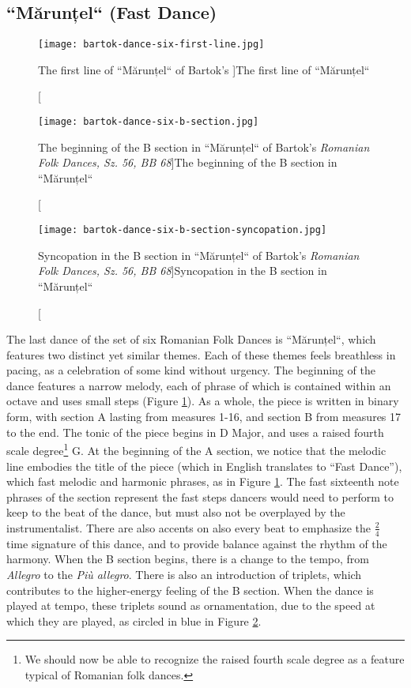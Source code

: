 \subsection{``Mărunțel`` (Fast Dance)}

\begin{figure}
  \centering
  \texttt{[image: bartok-dance-six-first-line.jpg]}
  \caption[The first line of ``Mărunțel`` of Bartok's ]{The first line of ``Mărunțel``}
  \label{fig:bartok-dance-six-first-line}
\end{figure}

\begin{figure}
  \centering
  \texttt{[image: bartok-dance-six-b-section.jpg]}
  \caption[The beginning of the B section in ``Mărunțel`` of Bartok's \textit{Romanian Folk Dances, Sz. 56, BB 68}]{The beginning of the B section in ``Mărunțel``}
  \label{fig:bartok-dance-six-b-section}
\end{figure}

\begin{figure}
  \centering
  \texttt{[image: bartok-dance-six-b-section-syncopation.jpg]}
  \caption[Syncopation in the B section in ``Mărunțel`` of Bartok's \textit{Romanian Folk Dances, Sz. 56, BB 68}]{Syncopation in the B section in ``Mărunțel``}
  \label{fig:bartok-dance-six-b-section-syncopation}
\end{figure}


The last dance of the set of six Romanian Folk Dances is ``Mărunțel``, which features two distinct yet similar themes. Each of these themes feels breathless in pacing, as a celebration of some kind without urgency. The beginning of the dance features a narrow melody, each of phrase of which is contained within an octave and uses small steps (Figure \ref{fig:bartok-dance-six-first-line}\autocite{Lung_2016}). As a whole, the piece is written in binary form, with section A lasting from measures 1-16, and section B from measures 17 to the end. The tonic of the piece begins in D Major, and uses a raised fourth scale degree\footnote{We should now be able to recognize the raised fourth scale degree as a feature typical of Romanian folk dances.} G\musSharp{}. At the beginning of the A section, we notice that the melodic line embodies the title of the piece (which in English translates to ``Fast Dance''), which fast melodic and harmonic phrases, as in Figure \ref{fig:bartok-dance-six-first-line}\autocite{Lung_2016}. The fast sixteenth note phrases of the section represent the fast steps dancers would need to perform to keep to the beat of the dance, but must also not be overplayed by the instrumentalist. There are also accents on also every beat to emphasize the $\frac{2}{4}$ time signature of this dance, and to provide balance against the rhythm of the harmony. When the B section begins, there is a change to the tempo, from \textit{Allegro} to the \textit{Più allegro}. There is also an introduction of triplets, which contributes to the higher-energy feeling of the B section. When the dance is played at tempo, these triplets sound as ornamentation, due to the speed at which they are played, as circled in blue in Figure \ref{fig:bartok-dance-six-b-section}\autocite{Lung_2016}. 

